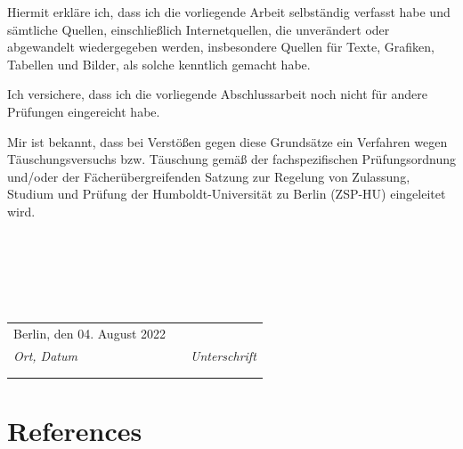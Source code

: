 \documentclass[12pt,twoside]{reedthesis}
\begin{document}
Hiermit erkläre ich, dass ich die vorliegende Arbeit selbständig verfasst habe und sämtliche Quellen, einschließlich Internetquellen, die unverändert oder abgewandelt wiedergegeben werden, insbesondere Quellen für Texte, Grafiken, Tabellen und Bilder, als solche kenntlich gemacht habe.

Ich versichere, dass ich die vorliegende Abschlussarbeit noch nicht für andere Prüfungen eingereicht habe.

Mir ist bekannt, dass bei Verstößen gegen diese Grundsätze ein Verfahren wegen Täuschungsversuchs bzw. Täuschung gemäß der fachspezifischen Prüfungsordnung und/oder der Fächerübergreifenden Satzung zur Regelung von Zulassung, Studium und Prüfung der Humboldt-Universität zu Berlin (ZSP-HU) eingeleitet wird.

\hfill\break
~

\hfill\break
~

\hfill\break
~
\begin{tabular}{m{6cm}m{2cm}m{6cm}}
Berlin, den 04. August 2022 &  &              \\ \cline{1-1} \cline{3-3} 
\textit{Ort, Datum}            &  & \textit{Unterschrift} \\
                       &  &              \\
                       &  &             
\end{tabular}
\backmatter

\hypertarget{references}{%
\chapter*{References}\label{references}}


\noindent

\setlength{\parindent}{-0.20in}
\end{document}
